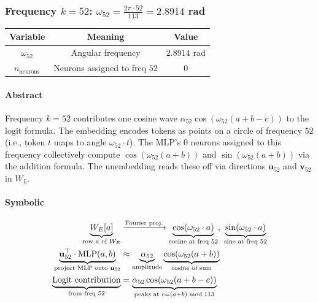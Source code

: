 \documentclass[11pt,a4paper]{article}
\begin{document}
\subsubsection{Frequency $k = 52$: $\omega_{52} = \frac{2\pi \cdot 52}{113} = 2.8914$ rad}

\begin{center}
\begin{tabular}{|c|c|c|}
\hline
\textbf{Variable} & \textbf{Meaning} & \textbf{Value} \\ \hline
  $\omega_{52}$ & Angular frequency & $2.8914$ rad \\ \hline
  $n_{\text{neurons}}$ & Neurons assigned to freq $52$ & $0$ \\ \hline
\end{tabular}
\end{center}

\paragraph{Abstract}
Frequency $k = 52$ contributes one cosine wave $\alpha_{52} \cos(\omega_{52}(a+b-c))$ to the logit formula. The embedding encodes tokens as points on a circle of frequency $52$ (i.e., token $t$ maps to angle $\omega_{52} \cdot t$). The MLP's 0 neurons assigned to this frequency collectively compute $\cos(\omega_{52}(a+b))$ and $\sin(\omega_{52}(a+b))$ via the addition formula. The unembedding reads these off via directions $\mathbf{u}_{52}$ and $\mathbf{v}_{52}$ in $W_L$.

\paragraph{Symbolic}
\begin{align}
    \underbrace{W_E[a]}_{\text{row } a \text{ of } W_E} &\xrightarrow{\text{Fourier proj.}} \underbrace{\cos\!\left(\omega_{52} \cdot a\right)}_{\text{cosine at freq } 52},\;\underbrace{\sin\!\left(\omega_{52} \cdot a\right)}_{\text{sine at freq } 52}    \notag \\
    \underbrace{\mathbf{u}_{52}^\top \cdot \text{MLP}(a,b)}_{\text{project MLP onto } \mathbf{u}_{52}} &\approx \underbrace{\alpha_{52}}_{\text{amplitude}} \underbrace{\cos(\omega_{52}(a+b))}_{\text{cosine of sum}}    \notag \\
    \underbrace{\text{Logit contribution}}_{\text{from freq } 52} &= \underbrace{\alpha_{52} \cos(\omega_{52}(a+b-c))}_{\text{peaks at } c = (a+b) \bmod 113}    \notag
\end{align}
\end{document}
